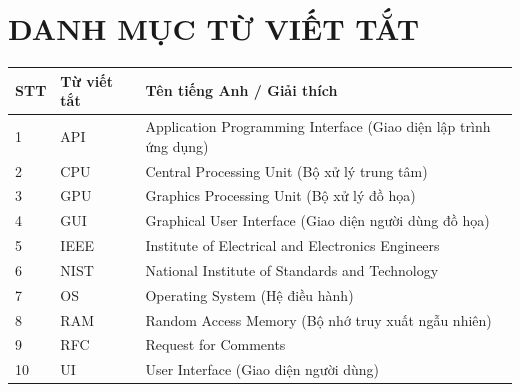 \chapter*{DANH MỤC TỪ VIẾT TẮT}

\begin{table}[H]
\centering
\begin{tabular}{|l|l|l|}
\hline
\textbf{STT} & \textbf{Từ viết tắt} & \textbf{Tên tiếng Anh / Giải thích} \\ \hline
1 & API & Application Programming Interface (Giao diện lập trình ứng dụng) \\ \hline
2 & CPU & Central Processing Unit (Bộ xử lý trung tâm) \\ \hline
3 & GPU & Graphics Processing Unit (Bộ xử lý đồ họa) \\ \hline
4 & GUI & Graphical User Interface (Giao diện người dùng đồ họa) \\ \hline
5 & IEEE & Institute of Electrical and Electronics Engineers \\ \hline
6 & NIST & National Institute of Standards and Technology \\ \hline
7 & OS & Operating System (Hệ điều hành) \\ \hline
8 & RAM & Random Access Memory (Bộ nhớ truy xuất ngẫu nhiên) \\ \hline
9 & RFC & Request for Comments \\ \hline
10 & UI & User Interface (Giao diện người dùng) \\ \hline
\end{tabular}
\end{table}

